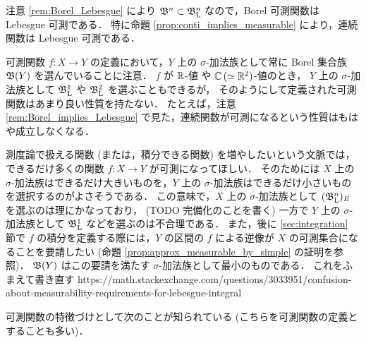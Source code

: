 \begin{remark}\label{rem:Borel_implies_Lebesgue}
    注意 \ref{rem:Borel_Lebesgue} により $\mathfrak{B}^n\subset\mathfrak{B}_{\mathrm{L}}^n$ なので，Borel 可測関数は Lebesgue 可測である．
    特に命題 \ref{prop:conti_implies_measurable} により，連続関数は Lebesgue 可測である．
\end{remark}

\begin{remark}[\!\!\cite{mo31603}]
    可測関数 $f:X\to Y$ の定義において，$Y$ 上の $\sigma$-加法族として常に Borel 集合族 $\mathfrak{B}(Y)$ を選んでいることに注意．
    $f$ が $\mathbb{R}$-値 や $\mathbb{C}\,(\simeq\mathbb{R}^2)$-値のとき，
    $Y$ 上の $\sigma$-加法族として $\mathfrak{B}_{\mathrm{L}}^1$ や $\mathfrak{B}_{\mathrm{L}}^2$ を選ぶこともできるが，
    そのようにして定義された可測関数はあまり良い性質を持たない．
    たとえば，注意 \ref{rem:Borel_implies_Lebesgue} で見た，連続関数が可測になるという性質はもはや成立しなくなる．

    測度論で扱える関数 (または，積分できる関数) を増やしたいという文脈では，できるだけ多くの関数 $f:X\to Y$ が可測になってほしい．
    そのためには $X$ 上の $\sigma$-加法族はできるだけ大きいものを，$Y$ 上の $\sigma$-加法族はできるだけ小さいものを選択するのがよさそうである．
    この意味で，$X$ 上の $\sigma$-加法族として $(\mathfrak{B}_{\mathrm{L}}^n)_E$ を選ぶのは理にかなっており，
    {\color{red}(TODO 完備化のことを書く)}
    一方で $Y$ 上の $\sigma$-加法族として $\mathfrak{B}_{\mathrm{L}}^1$ などを選ぶのは不合理である．
    また，後に \ref{sec:integration} 節で $f$ の積分を定義する際には，$Y$ の区間の $f$ による逆像が $X$ の可測集合になることを要請したい
    (命題 \ref{prop:approx_measurable_by_simple} の証明を参照)．
    $\mathfrak{B}(Y)$ はこの要請を満たす $\sigma$-加法族として最小のものである．
    {\color{red}
    これをふまえて書き直す https://math.stackexchange.com/questions/3033951/confusion-about-measurability-requirements-for-lebesgue-integral
    }
\end{remark}

可測関数の特徴づけとして次のことが知られている (こちらを可測関数の定義とすることも多い)．

